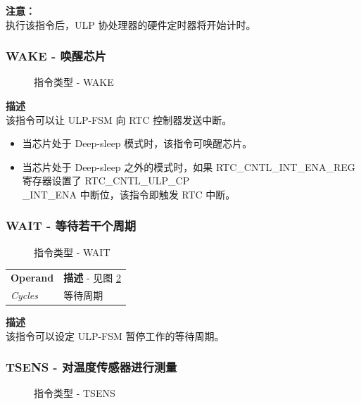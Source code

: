 \documentclass[main\_\_CN.tex]{subfiles}
\begin{document}
\textbf{注意：} \\
执行该指令后，ULP 协处理器的硬件定时器将开始计时。


\subsubsection{WAKE - 唤醒芯片}

%
%
%
%
\begin{figure}[H]
    \centering
    \caption{指令类型 - WAKE}
    \label{fig:WAKE}
\end{figure}

\vspace{-2em}
\textbf{描述} \\
该指令可以让 ULP-FSM 向 RTC 控制器发送中断。
\begin{itemize}
    \item 当芯片处于 Deep-sleep 模式时，该指令可唤醒芯片。
    \item 当芯片处于 Deep-sleep 之外的模式时，如果 RTC\_CNTL\_INT\_ENA\_REG 寄存器设置了 RTC\_CNTL\_ULP\_CP\\\_INT\_ENA 中断位，该指令即触发 RTC 中断。
\end{itemize}

\subsubsection{WAIT - 等待若干个周期}
%
%
%
\begin{figure}[H]
    \centering
    \caption{指令类型 - WAIT}
    \label{fig:WAIT}
\end{figure}

\vspace{-2em}
\begin{tabular}{ l l }
\textbf{Operand} & \textbf{描述} - 见图 \ref{fig:WAIT} \\
\textit{Cycles} & 等待周期
\end{tabular}

\textbf{描述} \\
该指令可以设定 ULP-FSM 暂停工作的等待周期。


\subsubsection{TSENS - 对温度传感器进行测量}

%
%
%
%
\begin{figure}[H]
    \centering
    \caption{指令类型 - TSENS}
    \label{fig:TSENS}
\end{figure}
\end{document}
